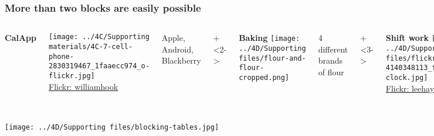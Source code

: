 \begin{frame}\frametitle{More than two blocks are easily possible}
	
	\begin{columns}[t]
			\textbf{CalApp}
			
			\texttt{[image: ../4C/Supporting materials/4C-7-cell-phone-2830319467\_1faaecc974\_o-flickr.jpg]}
			\\
			{\tiny{\href{https://secure.flickr.com/photos/williamhook/2830319467/}{Flickr: williamhook}}}
			
			\vspace{1cm}
			Apple, Android, Blackberry
		
		
			\onslide+<2->{
				\textbf{Baking}
				\texttt{[image: ../4D/Supporting files/flour-and-flour-cropped.png]}
		
				\vspace{1.1cm}
				4 different brands of flour
			}
			
			\onslide+<3->{
				\textbf{Shift work}
				\texttt{[image: ../4D/Supporting files/flickr-4140348113\_f0efc8235b\_z-clock.jpg]}
				\\
				{\tiny{\href{https://secure.flickr.com/photos/leehaywood/4140348113}{Flickr: leehaywood}}}
				
				
				
				\vspace{0.8cm}
				Day shift\\
				Afternoon shift\\
				Night shift
			}
		
			\onslide+<4->{
				\textbf{Gas mileage}
				
				\texttt{[image: ../4C/Supporting materials/4C-6-gas-mileage.png]}
				
				\vspace{1.65cm}
				Gasoline brand 1\\
				Gasoline brand 2\\
				Gasoline brand 3\\
			}
			
	\end{columns}
	
	
\end{frame}

\begin{frame}\frametitle{}
	\centerline{\texttt{[image: ../4D/Supporting files/blocking-tables.jpg]}}
\end{frame}

